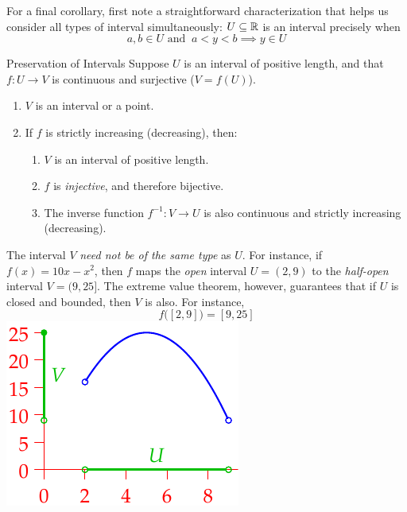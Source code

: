 \goodbreak


For a final corollary, first note a straightforward characterization that helps us consider all types of interval simultaneously: $U\subseteq\mathbb{R}$ is an interval precisely when
\[
	a,b\in U \text{ and }\ a<y<b\implies y\in U \tag{$\ast$}
\]

\begin{cor}{Preservation of Intervals}{}
	Suppose $U$ is an interval of positive length, and that $f:U\to V$ is continuous and surjective ($V=f(U)$).\vspace{-1pt}
	\begin{enumerate}\itemsep0pt
	  \item $V$ is an interval or a point.
	  \item If $f$ is strictly increasing (decreasing), then:\vspace{-3pt}
		\begin{enumerate}
		  \item $V$ is an interval of positive length.
		  \item $f$ is \emph{injective}, and therefore bijective.
		  \item The inverse function $f^{-1}:V\to U$ is also continuous and strictly increasing (decreasing).
		\end{enumerate}
	\end{enumerate}
\end{cor}

\begin{example}[lower separated=false, sidebyside, sidebyside align=top seam, sidebyside gap=0pt, righthand width=0.3\linewidth]{}{}
	The interval $V$ \emph{need not be of the same type} as $U$. For instance, if $f(x)=10x-x^2$, then $f$ maps the \emph{open} interval $U=(2,9)$ to the \emph{half-open} interval $V=(9,25]$.\smallbreak
	The extreme value theorem, however, guarantees that if $U$ is closed and bounded, then $V$ is also. For instance,
	\[
		f\bigl([2,9]\bigr)=[9,25]
	\]
	\tcblower
	\flushright\includegraphics[scale=0.95]{intval4}
\end{example}


